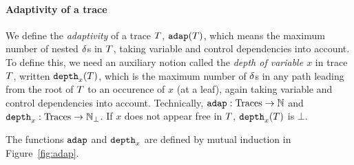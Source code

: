 \documentclass[a4paper,11pt]{article}
\theoremstyle{definition}
\begin{document}
\paragraph{Adaptivity of a trace}
We define the \emph{adaptivity} of a trace $T$, $\mathtt{adap}(T)$, which
means the maximum number of nested $\delta$s in $T$, taking variable
and control dependencies into account. To define this, we need an
auxiliary notion called the \emph{depth of variable $x$} in trace
$T$, written $\mathtt{depth}_{x}(T)$, which is the maximum number of
$\delta{}$s in any path leading from the root of $T$ to an occurence
of $x$ (at a leaf), again taking variable and control dependencies
into account. Technically, $\mathtt{adap}: \mbox{Traces} \to \mathbb{N}$ and
$\mathtt{depth}_{x}: \mbox{Traces} \to \mathbb{N}_{\bot}$. If $x$ does not appear free in
$T$, $\mathtt{depth}_{x}(T)$ is $\bot$.

The functions $\mathtt{adap}$ and $\mathtt{depth}_{x}$ are defined by mutual induction
in Figure~\ref{fig:adap}. 
\end{document}

